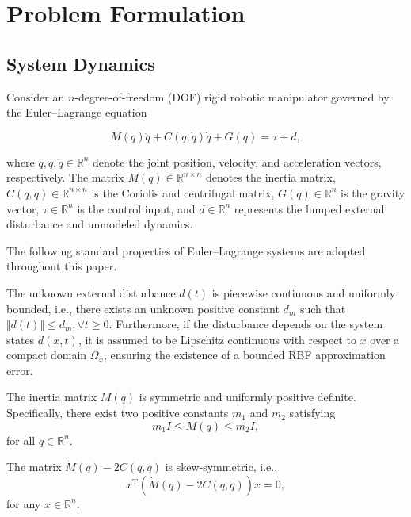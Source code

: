 \section{Problem Formulation}

\subsection{System Dynamics}

Consider an $n$-degree-of-freedom (DOF) rigid robotic manipulator governed by the Euler--Lagrange equation

\begin{equation}
	M(q)\ddot q+C(q,\dot q)\dot q+G(q)=\tau+d,
	\label{eq:dynamics}
\end{equation}

where $q,\dot q,\ddot q\in\mathbb{R}^n$ denote the joint position, velocity, and acceleration vectors, respectively. The matrix $M(q)\in\mathbb{R}^{n\times n}$ denotes the inertia matrix, $C(q,\dot q)\in\mathbb{R}^{n\times n}$ is the Coriolis and centrifugal matrix, $G(q)\in\mathbb{R}^n$ is the gravity vector, $\tau\in\mathbb{R}^n$ is the control input, and $d\in\mathbb{R}^n$ represents the lumped external disturbance and unmodeled dynamics.

The following standard properties of Euler--Lagrange systems are adopted throughout this paper.

\begin{assumption}
	The unknown external disturbance $d(t)$ is piecewise continuous and uniformly bounded, i.e., there exists an unknown positive constant $d_m$ such that $\Vert{}d(t)\Vert{} \le d_m, \forall t \ge 0$. Furthermore, if the disturbance depends on the system states $d(x, t)$, it is assumed to be Lipschitz continuous with respect to $x$ over a compact domain $\Omega_x$, ensuring the existence of a bounded RBF approximation error.
\end{assumption}

\begin{property}
	The inertia matrix $M(q)$ is symmetric and uniformly positive definite. Specifically, there exist two positive constants $m_1$ and $m_2$ satisfying
	\begin{equation}
		m_1I\le M(q)\le m_2I,
	\end{equation}
	for all $q\in\mathbb{R}^n$.
\end{property}

\begin{property}
	The matrix $\dot M(q)-2C(q,\dot q)$ is skew-symmetric, i.e.,
	\begin{equation}
		x^{\mathrm T}\!\left(\dot M(q)-2C(q,\dot q)\right)x=0,
	\end{equation}
	for any $x\in\mathbb{R}^n$.
\end{property}

